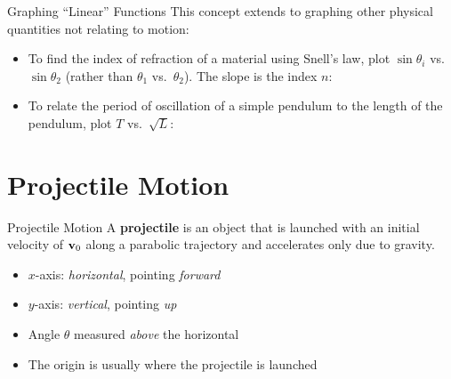 \documentclass[12pt,compress,aspectratio=169]{beamer}
\newcommand{\mb}[1]{\ensuremath\mathbf{#1}}
\newcommand{\eq}[2]{\vspace{#1}{\Large\begin{displaymath}#2\end{displaymath}}}
\begin{document}
\begin{frame}{Graphing ``Linear'' Functions}
  This concept extends to graphing other physical quantities not relating to
  motion:
  \begin{itemize}
  \item To find the index of refraction of a material using Snell's law, plot
    $\sin\theta_i$ vs.\ $\sin\theta_2$ (rather than $\theta_1$ vs.\ $\theta_2$).
    The slope is the index $n$:

    \eq{-.25in}{
      \underbracket{\sin\theta_1}_y=\underbracket{n}_m
      \underbracket{\sin\theta_2}_x
    }
  \item To relate the period of oscillation of a simple pendulum to the length
    of the pendulum, plot $T$ vs.\ $\sqrt{L}$:

    \eq{-.2in}{
      \underbracket{T}_y=\underbracket{\frac{2\pi}{\sqrt{g}}}_m
      \underbracket{\sqrt{L}}_x
    }
  \end{itemize}
\end{frame}

\section{Projectile Motion}

\begin{frame}{Projectile Motion}
  A \textbf{projectile} is an object that is launched with an initial velocity
  of $\mb{v}_0$ along a parabolic trajectory and accelerates only due to
  gravity.
  \begin{center}
  \end{center}
  \begin{itemize}
  \item $x$-axis: \emph{horizontal}, pointing \emph{forward}
  \item $y$-axis: \emph{vertical}, pointing \emph{up}
  \item Angle $\theta$ measured \emph{above} the horizontal
  \item The origin is usually where the projectile is launched
  \end{itemize}
\end{frame}
\end{document}
